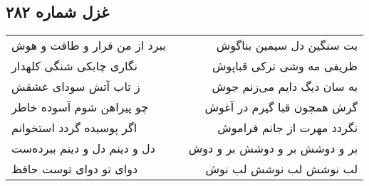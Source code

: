 \begin{center}
\section*{غزل شماره ۲۸۲}
\label{sec:sh282}
\begin{longtable}{l p{0.5cm} r}
ببرد از من قرار و طاقت و هوش
&&
بت سنگین دل سیمین بناگوش
\\
نگاری چابکی شنگی کلهدار
&&
ظریفی مه وشی ترکی قباپوش
\\
ز تاب آتش سودای عشقش
&&
به سان دیگ دایم می‌زنم جوش
\\
چو پیراهن شوم آسوده خاطر
&&
گرش همچون قبا گیرم در آغوش
\\
اگر پوسیده گردد استخوانم
&&
نگردد مهرت از جانم فراموش
\\
دل و دینم دل و دینم ببرده‌ست
&&
بر و دوشش بر و دوشش بر و دوش
\\
دوای تو دوای توست حافظ
&&
لب نوشش لب نوشش لب نوش
\\
\end{longtable}
\end{center}
